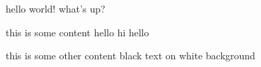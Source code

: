 \begin{test}
    hello world!
    what's up?
\end{test}

\begin{test}
    this is some content
    hello hi hello
\end{test}

\begin{test}
    this is some other content
    black text on white background
\end{test}